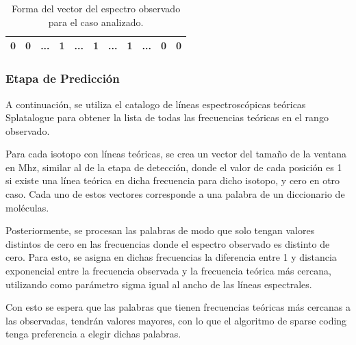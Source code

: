\documentclass[twocolumn, draft]{emulateapj}
\begin{document}
\begin {table}[H]
\begin{center}
	\begin{tabular}{|c|c|c|c|c|c|c|c|c|c|c|}
		\hline 0 & 0 &  ... &  1 & ... &  1 & ... & 1 & ... & 0 & 0 \\ 
		\hline
	\end{tabular}
	\caption {Forma del vector del espectro observado para el caso analizado.}
\end{center}
\end{table}

\subsubsection{Etapa de Predicción}

A continuación, se utiliza el catalogo de líneas espectroscópicas teóricas Splatalogue para obtener la lista de todas las frecuencias teóricas en el rango observado.

Para cada isotopo con líneas teóricas, se crea un vector del tamaño de la ventana en Mhz, similar al de la etapa de detección, donde el valor de cada posición es 1 si existe una línea teórica en dicha frecuencia para dicho isotopo, y cero en otro caso. Cada uno de estos vectores corresponde a una palabra de un diccionario de moléculas.

Posteriormente, se procesan las palabras de modo que solo tengan valores distintos de cero en las frecuencias donde el espectro observado es distinto de cero. Para esto, se asigna en dichas frecuencias la diferencia entre 1 y distancia exponencial entre la frecuencia observada y la frecuencia teórica más cercana, utilizando como parámetro sigma igual al ancho de las líneas espectrales.

Con esto se espera que las palabras que tienen frecuencias teóricas más cercanas a las observadas, tendrán valores mayores, con lo que el algoritmo de sparse coding tenga preferencia a elegir dichas palabras.
\end{document}

